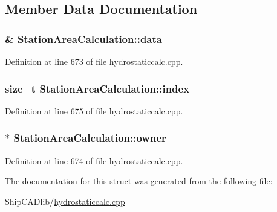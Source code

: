 \subsection{Member Data Documentation}
\hypertarget{structStationAreaCalculation_ad1b380c3cc7135b5d659c7efb5a961c2}{
\subsubsection[{data}]{\& Station\-Area\-Calculation\-::data}}\label{structStationAreaCalculation_ad1b380c3cc7135b5d659c7efb5a961c2}


Definition at line 673 of file hydrostaticcalc.\-cpp.

\hypertarget{structStationAreaCalculation_acc4a19c9d552a68803dd255c31350d8e}{
\subsubsection[{index}]{\setlength{\rightskip}{0pt plus 5cm}size\-\_\-t Station\-Area\-Calculation\-::index}}\label{structStationAreaCalculation_acc4a19c9d552a68803dd255c31350d8e}


Definition at line 675 of file hydrostaticcalc.\-cpp.

\hypertarget{structStationAreaCalculation_a84d2ad6a33b1d6e2db182bebf0a5d7af}{
\subsubsection[{owner}]{$\ast$ Station\-Area\-Calculation\-::owner}}\label{structStationAreaCalculation_a84d2ad6a33b1d6e2db182bebf0a5d7af}


Definition at line 674 of file hydrostaticcalc.\-cpp.



The documentation for this struct was generated from the following file\-:\begin{DoxyCompactItemize}
\item 
Ship\-C\-A\-Dlib/\hyperlink{hydrostaticcalc_8cpp}{hydrostaticcalc.\-cpp}\end{DoxyCompactItemize}
